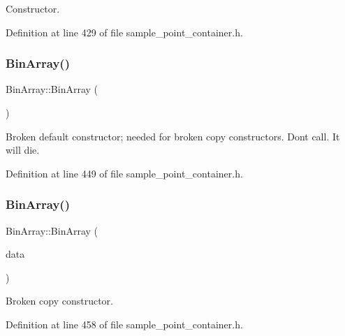 Constructor. 



Definition at line 429 of file sample\+\_\+point\+\_\+container.\+h.

\mbox{\label{classBinArray_ae1bd440bc2eb6436158d306e26309eba}} 
\subsubsection{\texorpdfstring{Bin\+Array()}{BinArray()}\hspace{0.1cm}{\footnotesize\ttfamily [2/3]}}
{\footnotesize\ttfamily Bin\+Array\+::\+Bin\+Array (\begin{DoxyParamCaption}{ }\end{DoxyParamCaption})\hspace{0.3cm}{\ttfamily [inline]}}



Broken default constructor; needed for broken copy constructors. Don\textquotesingle{}t call. It will die. 



Definition at line 449 of file sample\+\_\+point\+\_\+container.\+h.

\mbox{\label{classBinArray_a2e31e002f8c7ac1affc76c4ef48599a2}} 
\subsubsection{\texorpdfstring{Bin\+Array()}{BinArray()}\hspace{0.1cm}{\footnotesize\ttfamily [3/3]}}
{\footnotesize\ttfamily Bin\+Array\+::\+Bin\+Array (\begin{DoxyParamCaption}\item[{const \hyperlink{classBinArray}{Bin\+Array} \&}]{data }\end{DoxyParamCaption})\hspace{0.3cm}{\ttfamily [inline]}}



Broken copy constructor. 



Definition at line 458 of file sample\+\_\+point\+\_\+container.\+h.



